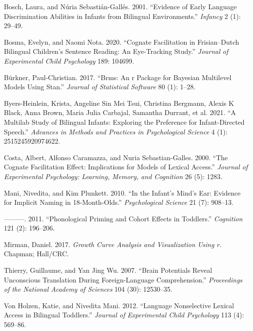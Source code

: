 \documentclass[
]{article}
\newlength{\cslhangindent}
\newenvironment{CSLReferences}[2] %
 {%
  \setlength{\parindent}{0pt}
  \ifodd #1 \everypar{\setlength{\hangindent}{\cslhangindent}}\ignorespaces\fi
  \ifnum #2 > 0
  \setlength{\parskip}{#2\baselineskip}
  \fi
 }%
 {}
\begin{document}
\hypertarget{refs}{}
\begin{CSLReferences}{1}{0}
\leavevmode{}%
Bosch, Laura, and Núria Sebastián-Gallés. 2001. {``Evidence of Early
Language Discrimination Abilities in Infants from Bilingual
Environments.''} \emph{Infancy} 2 (1): 29--49.

\leavevmode{}%
Bosma, Evelyn, and Naomi Nota. 2020. {``Cognate Facilitation in
Frisian--Dutch Bilingual Children's Sentence Reading: An Eye-Tracking
Study.''} \emph{Journal of Experimental Child Psychology} 189: 104699.

\leavevmode{}%
Bürkner, Paul-Christian. 2017. {``Brms: An r Package for Bayesian
Multilevel Models Using Stan.''} \emph{Journal of Statistical Software}
80 (1): 1--28.

\leavevmode{}%
Byers-Heinlein, Krista, Angeline Sin Mei Tsui, Christina Bergmann,
Alexis K Black, Anna Brown, Maria Julia Carbajal, Samantha Durrant, et
al. 2021. {``A Multilab Study of Bilingual Infants: Exploring the
Preference for Infant-Directed Speech.''} \emph{Advances in Methods and
Practices in Psychological Science} 4 (1): 2515245920974622.

\leavevmode{}%
Costa, Albert, Alfonso Caramazza, and Nuria Sebastian-Galles. 2000.
{``The Cognate Facilitation Effect: Implications for Models of Lexical
Access.''} \emph{Journal of Experimental Psychology: Learning, Memory,
and Cognition} 26 (5): 1283.

\leavevmode{}%
Mani, Nivedita, and Kim Plunkett. 2010. {``In the Infant's Mind's Ear:
Evidence for Implicit Naming in 18-Month-Olds.''} \emph{Psychological
Science} 21 (7): 908--13.

\leavevmode{}%
---------. 2011. {``Phonological Priming and Cohort Effects in
Toddlers.''} \emph{Cognition} 121 (2): 196--206.

\leavevmode{}%
Mirman, Daniel. 2017. \emph{Growth Curve Analysis and Visualization
Using r}. Chapman; Hall/CRC.

\leavevmode{}%
Thierry, Guillaume, and Yan Jing Wu. 2007. {``Brain Potentials Reveal
Unconscious Translation During Foreign-Language Comprehension.''}
\emph{Proceedings of the National Academy of Sciences} 104 (30):
12530--35.

\leavevmode{}%
Von Holzen, Katie, and Nivedita Mani. 2012. {``Language Nonselective
Lexical Access in Bilingual Toddlers.''} \emph{Journal of Experimental
Child Psychology} 113 (4): 569--86.

\end{CSLReferences}
\end{document}
